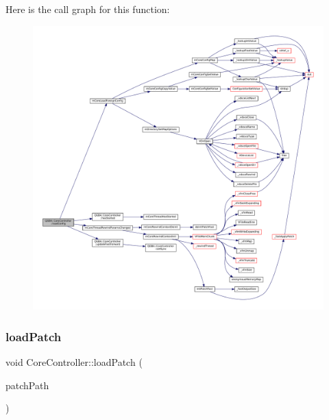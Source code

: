 Here is the call graph for this function\+:
\nopagebreak
\begin{figure}[H]
\begin{center}
\leavevmode
\includegraphics[width=350pt]{class_q_g_b_a_1_1_core_controller_a9289bc6fcbd0674874ce011528dfd146_cgraph}
\end{center}
\end{figure}
\mbox{\label{class_q_g_b_a_1_1_core_controller_a2b403c6740acab8b9e752375e35110cb}} 
\subsubsection{\texorpdfstring{load\+Patch}{loadPatch}}
{\footnotesize\ttfamily void Core\+Controller\+::load\+Patch (\begin{DoxyParamCaption}\item[{const Q\+String \&}]{patch\+Path }\end{DoxyParamCaption})\hspace{0.3cm}{\ttfamily [slot]}}

